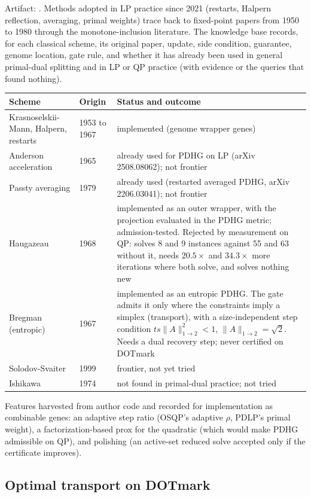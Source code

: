 Artifact: . Methods adopted in LP practice
since 2021 (restarts, Halpern reflection, averaging, primal weights) trace
back to fixed-point papers from 1950 to 1980 through the monotone-inclusion
literature. The knowledge base records, for each classical scheme, its
original paper, update, side condition, guarantee, genome location, gate
rule, and whether it has already been used in general primal-dual splitting
and in LP or QP practice (with evidence or the queries that found nothing).

\begin{center}
\small
\begin{tabular}{p{2.6cm}p{2.2cm}p{7.6cm}}
\toprule
Scheme & Origin & Status and outcome \\
\midrule
Krasnoselskii-Mann, Halpern, restarts & 1953 to 1967 & implemented (genome wrapper genes) \\
Anderson acceleration & 1965 & already used for PDHG on LP (arXiv 2508.08062); not frontier \\
Passty averaging & 1979 & already used (restarted averaged PDHG, arXiv 2206.03041); not frontier \\
Haugazeau & 1968 & implemented as an outer wrapper, with the projection evaluated in the PDHG metric; admission-tested. Rejected by measurement on QP: solves 8 and 9 instances against 55 and 63 without it, needs $20.5\times$ and $34.3\times$ more iterations where both solve, and solves nothing new \\
Bregman (entropic) & 1967 & implemented as an entropic PDHG. The gate admits it only where the constraints imply a simplex (transport), with a size-independent step condition $t s \|A\|_{1\to2}^2<1$, $\|A\|_{1\to2}=\sqrt2$. Needs a dual recovery step; never certified on DOTmark \\
Solodov-Svaiter & 1999 & frontier, not yet tried \\
Ishikawa & 1974 & not found in primal-dual practice; not tried \\
\bottomrule
\end{tabular}
\end{center}

Features harvested from author code and recorded for implementation as
combinable genes: an adaptive step ratio (OSQP's adaptive $\rho$, PDLP's
primal weight), a factorization-based prox for the quadratic (which would
make PDHG admissible on QP), and polishing (an active-set reduced solve
accepted only if the certificate improves).

\subsection{Optimal transport on DOTmark}
\label{app:log:ot}

